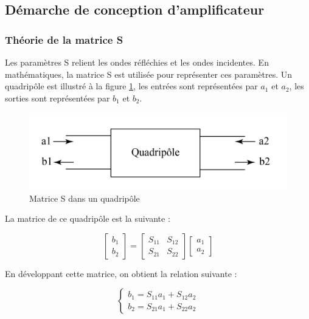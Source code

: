 \documentclass[french]{article}
\begin{document}
\subsection{Démarche de conception d’amplificateur}

\subsubsection{Théorie de la matrice S}
Les paramètres S relient les ondes réfléchies et les ondes incidentes. En mathématiques, la matrice S est utilisée pour représenter ces paramètres. Un quadripôle est illustré à la figure \ref{fig:matrice_s}, les entrées sont représentées par $a_{1}$ et $a_{2}$, les sorties sont représentées par $b_{1}$ et $b_{2}$. 

\begin{figure}[H]
	\centering
	\includegraphics[width=0.9\linewidth]{../5SynthAmp/Matrice_S}
	\caption{Matrice S dans un quadripôle}
	\label{fig:matrice_s}
\end{figure}

La matrice de ce quadripôle est la suivante :

\begin{equation}
	\begin{bmatrix}
		b_{1}\\
		b_{2}
	\end{bmatrix}
	=
	\begin{bmatrix}
		S_{11} & S_{12}\\
		S_{21} & S_{22}
	\end{bmatrix}
	\begin{bmatrix}
		a_{1}\\
		a_{2}
	\end{bmatrix}
\end{equation}

En développant cette matrice, on obtient la relation suivante :

\begin{equation}
	\left\{\begin{matrix}
		b_{1}=S_{11}a_{1}+S_{12}a_{2}\\
		b_{2}=S_{21}a_{1}+S_{22}a_{2}
	\end{matrix}\right.
	\label{eqmatrix}
\end{equation}
\end{document}
